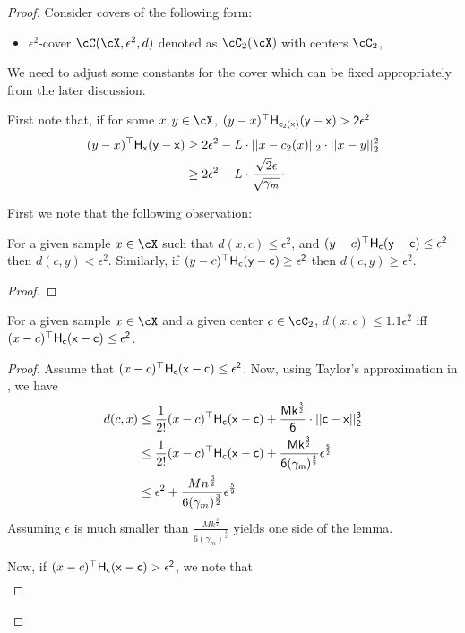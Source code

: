 \begin{proof}
    Consider covers of the following form:
    \begin{itemize}
        \item $\epsilon^2$-cover $\cC(\cX, \epsilon^2, d)$ denoted as $\cC_2(\cX)$ with centers $\cC_2$,
    \end{itemize}
    We need to adjust some constants for the cover which can be fixed appropriately from the later discussion. 

    First note that, if for some $x, y \in \cX$, $(y - x)^{\top}\sf{H}_{c_2(x)}(y - x) > 2\epsilon^2$
    \begin{align*}
        (y - x)^{\top}\sf{H}_{x}(y - x) &\ge 2\epsilon^2 - L\cdot ||x - c_2(x)||_2\cdot ||x - y||_2^2\\
                                        &\ge 2\epsilon^2 - L \cdot \frac{\sqrt{2}\epsilon}{\sqrt{\gamma_m}} \cdot 
    \end{align*}



    First we note that the following observation:
    \begin{lemma}
        For a given sample $x \in \cX$ such that $d(x,c) \le \epsilon^2$, and $(y- c)^{\top}\sf{H}_c(y-c) \le \epsilon^2$ then $d(c,y) < \epsilon^2$. Similarly, if $(y- c)^{\top}\sf{H}_c(y-c) \ge \epsilon^2$ then $d(c,y) \ge \epsilon^2$.
    \end{lemma}
    \begin{proof}
        
    \end{proof}
    \begin{lemma}
        For a given sample $x \in \cX$ and a given center $c \in \cC_2$, $d(x,c) \le 1.1\epsilon^2$ iff $(x- c)^{\top}\sf{H}_c(x-c) \le \epsilon^2$.
    \end{lemma}
    \begin{proof}
        Assume that $(x- c)^{\top}\sf{H}_c(x-c) \le \epsilon^2$. Now, using Taylor's approximation in , we have 
        \begin{align*}
            d(c,x) &\le \frac{1}{2!}(x-c)^{\top} \sf{H}_c (x-c) + \frac{M k^{\frac{3}{2}}}{6} \cdot||c-x||^{3}_2 \\
            &\le \frac{1}{2!}(x-c)^{\top} \sf{H}_c (x-c) + \frac{M k^{\frac{3}{2}}}{6(\gamma_m)^{\frac{3}{2}}}\epsilon^{\frac{5}{2}}\\
            &\le \epsilon^2 + \frac{M n^{\frac{3}{2}}}{6(\gamma_m)^{\frac{3}{2}}}\epsilon^{\frac{5}{2}}
        \end{align*}
        Assuming $\epsilon$ is much smaller than $\frac{M k^{\frac{3}{2}}}{6(\gamma_m)^{\frac{3}{2}}}$ yields one side of the lemma.

        Now, if $(x- c)^{\top}\sf{H}_c(x-c) > \epsilon^2$, we note that
        \begin{align*}
        \end{align*}
        
    \end{proof}
\end{proof}

